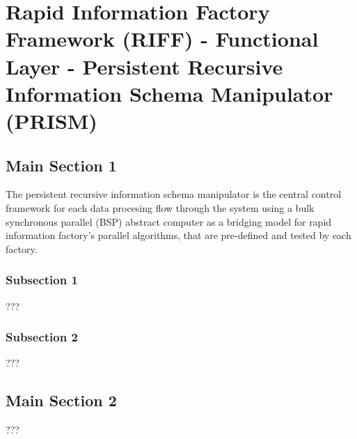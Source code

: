 
\chapter{Rapid Information Factory Framework (RIFF) - Functional Layer - Persistent Recursive Information Schema Manipulator (PRISM)} %

\label{Chapter09} %



\section{Main Section 1}

The persistent recursive information schema manipulator is the central control framework for each data procesing flow through the system using a bulk synchronous parallel (BSP) abstract computer as a bridging model for rapid information factory's parallel algorithms, that are pre-defined and tested by each factory.

\subsection{Subsection 1}

???


\subsection{Subsection 2}

???


\section{Main Section 2}

???
